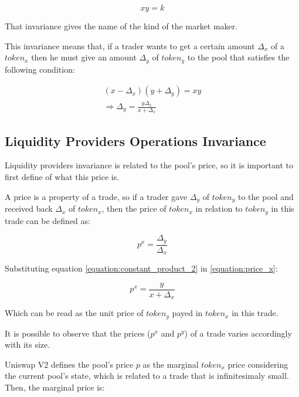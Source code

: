 \documentclass{article}
\begin{document}
\begin{equation}
    \label{equation:constant_product}
    xy=k
\end{equation}

That invariance gives the name of the kind of the market maker.

This invariance means that, if a trader wants to get a certain amount $\Delta_x$ of a $token_x$ then he must give an amount $\Delta_y$ of $token_y$ to the pool that satisfies the following condition:

\begin{equation}
    \label{equation:constant_product_2}
    \begin{split}
        (x - \Delta_x)(y + \Delta_y)=xy \\
        \Rightarrow \Delta_y=\frac{y\Delta_x}{x + \Delta_x}
    \end{split}
\end{equation}

\subsection{Liquidity Providers Operations Invariance}
\label{section:liquidity_providers_invariance}

Liquidity providers invariance is related to the pool's price, so it is important to first define of what this price is.

A price is a property of a trade, so if a trader gave $\Delta_y$ of $token_y$ to the pool and received back $\Delta_x$ of $token_x$, then the price of $token_x$ in relation to $token_y$ in this trade can be defined as:

\begin{equation}
    \label{equation:price_x}
    p^x=\frac{\Delta_y}{\Delta_x}
\end{equation}

Substituting equation \ref{equation:constant_product_2} in \ref{equation:price_x}:

\begin{equation}
    \label{equation:price_x_2}
    p^x=\frac{y}{x+\Delta_x}
\end{equation}

Which can be read as the unit price of $token_y$ payed in $token_x$ in this trade.

It is possible to observe that the prices ($p^x$ and $p^y$) of a trade varies accordingly with its size.

Uniswap V2 defines the pool's price $p$ as the marginal $token_x$ price considering the current pool's state, which is related to a trade that is infinitesimaly small.
Then, the marginal price is:
\end{document}

